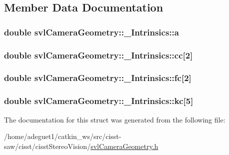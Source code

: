 \subsection{Member Data Documentation}
\hypertarget{structsvl_camera_geometry_1_1___intrinsics_a5be499added3f5b792cf599759314df1}{
\subsubsection[{a}]{\setlength{\rightskip}{0pt plus 5cm}double svl\-Camera\-Geometry\-::\-\_\-\-Intrinsics\-::a}}\label{structsvl_camera_geometry_1_1___intrinsics_a5be499added3f5b792cf599759314df1}
\hypertarget{structsvl_camera_geometry_1_1___intrinsics_a5bc8870b1606f4d5c9da2ee4ada62e0d}{
\subsubsection[{cc}]{\setlength{\rightskip}{0pt plus 5cm}double svl\-Camera\-Geometry\-::\-\_\-\-Intrinsics\-::cc\mbox{[}2\mbox{]}}}\label{structsvl_camera_geometry_1_1___intrinsics_a5bc8870b1606f4d5c9da2ee4ada62e0d}
\hypertarget{structsvl_camera_geometry_1_1___intrinsics_a2f1e1affb6703fb2de4ab27422945147}{
\subsubsection[{fc}]{\setlength{\rightskip}{0pt plus 5cm}double svl\-Camera\-Geometry\-::\-\_\-\-Intrinsics\-::fc\mbox{[}2\mbox{]}}}\label{structsvl_camera_geometry_1_1___intrinsics_a2f1e1affb6703fb2de4ab27422945147}
\hypertarget{structsvl_camera_geometry_1_1___intrinsics_ac898a7e5d9a1062d6073288b38e91492}{
\subsubsection[{kc}]{\setlength{\rightskip}{0pt plus 5cm}double svl\-Camera\-Geometry\-::\-\_\-\-Intrinsics\-::kc\mbox{[}5\mbox{]}}}\label{structsvl_camera_geometry_1_1___intrinsics_ac898a7e5d9a1062d6073288b38e91492}


The documentation for this struct was generated from the following file\-:\begin{DoxyCompactItemize}
\item 
/home/adeguet1/catkin\-\_\-ws/src/cisst-\/saw/cisst/cisst\-Stereo\-Vision/\hyperlink{svl_camera_geometry_8h}{svl\-Camera\-Geometry.\-h}\end{DoxyCompactItemize}
